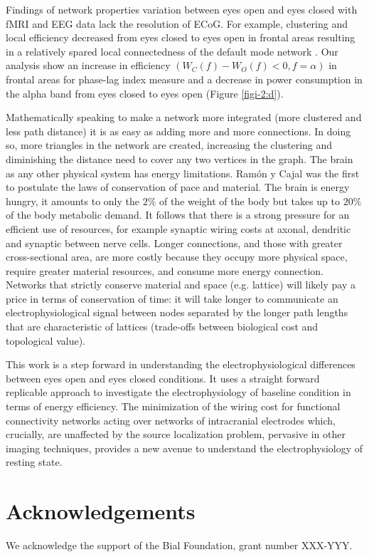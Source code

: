 \documentclass[11pt, onecolumn]{article}
\begin{document}
Findings of network properties variation between eyes open and eyes closed with fMRI and EEG data lack the resolution of ECoG. For example, clustering and local efficiency decreased from eyes closed to eyes open in frontal areas resulting in a relatively spared local connectedness of the default mode network \citep{scheeringa2008frontal}. Our analysis show an increase in efficiency $(W_C(f) - W_O(f) < 0, f = \alpha)$ in frontal areas for phase-lag index measure and a decrease in power consumption in the alpha band from eyes closed to eyes open (Figure \ref{figi-2:d}).

Mathematically speaking to make a network more integrated (more clustered and less path distance) it is as easy as adding more and more connections. In doing so, more triangles in the network are created, increasing the clustering and diminishing the distance need to cover any two vertices in the graph.
The brain as any other physical system has energy limitations. Ram{\'o}n y Cajal was the first to postulate the laws of conservation of pace and material. The brain is energy hungry, it amounts to only the $2\%$ of the weight of the body but takes up to $20\%$ of the body metabolic demand. It follows that there is a strong pressure for an efficient use of resources, for example synaptic wiring costs at axonal, dendritic and synaptic between nerve cells.
Longer connections, and those with greater cross-sectional area, are more costly because they occupy more physical space, require greater material resources, and consume more energy connection. Networks that strictly conserve material and space (e.g. lattice) will likely pay a price in terms of conservation of time: it will take longer to communicate an electrophysiological signal between nodes separated by the longer path lengths that are characteristic of lattices \citep{fornito2016fundamentals} (trade-offs between biological cost and topological value). 

This work is a step forward in understanding the electrophysiological differences between eyes open and eyes closed conditions. It uses a straight forward replicable approach to investigate the electrophysiology of baseline condition in terms of energy efficiency. The minimization of the wiring cost for functional connectivity networks acting over networks of intracranial electrodes which, crucially, are unaffected by the source localization problem, pervasive in other imaging techniques, provides a new avenue to understand the electrophysiology of resting state.

\section*{Acknowledgements}
We acknowledge the support of the Bial Foundation, grant number XXX-YYY.


%

\end{document}
